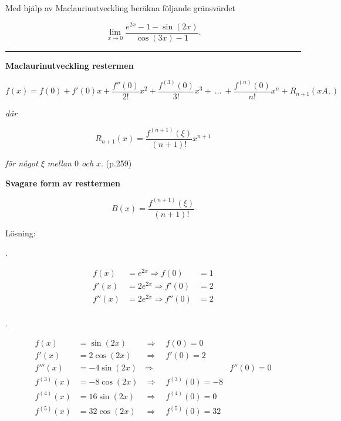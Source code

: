 \documentclass[11pt]{article}
\newcommand*\circled[1]{\tikz[baseline=(char.base)]{
            \node[shape=circle,draw,inner sep=1pt] (char) {#1};}}
\begin{document}
Med hjälp av Maclaurinutveckling beräkna följande gränsvärdet

\[
    \lim_{x \to 0} \frac{e^{2x} - 1 - \sin(2x)}{\cos(3x) - 1}.
\]

\noindent\rule{\textwidth}{0.5pt}

\textbf{Maclaurinutveckling restermen}

\[
    f(x) = f(0) + f'(0)x + \frac{f''(0)}{2!}x^2 + \frac{f^{(3)}(0)}{3!}x^3 +\ ...\ + \frac{f^{(n)}(0)}{n!}x^n + R_{n + 1}(xA,)
\]

\textit{där}


\[
    R_{n + 1}(x) = \frac{f^{(n + 1)}(\xi)}{(n +  1)!}x^{n + 1}
\]

\textit{för något $\xi$ mellan $0$ och $x$}. (p.259)

\textbf{Svagare form av resttermen}

\[
    B(x) = \frac{f^{(n + 1)}(\xi)}{(n + 1)!}
\]

Lösning:

\circled{1}.%
\begin{minipage}[t]{5cm}
    \setlength{\abovedisplayskip}{0pt}
    \setlength{\belowdisplayskip}{0pt}
    \setlength{\abovedisplayshortskip}{0pt}
    \setlength{\belowdisplayshortskip}{0pt}
    \begin{align*}
        f(x)  &= e^{2x} \Rightarrow f(0) &= 1\\
        f'(x) &= 2e^{2x} \Rightarrow f'(0) &= 2\\
        f''(x) &= 2e^{2x} \Rightarrow f''(0) &= 2\\
    \end{align*}
\end{minipage}

\circled{2}.%
\begin{minipage}[t]{5cm}
    \setlength{\abovedisplayskip}{0pt}
    \setlength{\belowdisplayskip}{0pt}
    \setlength{\abovedisplayshortskip}{0pt}
    \setlength{\belowdisplayshortskip}{0pt}
    \begin{align*}
        f(x)  &= \sin(2x) &\Rightarrow\quad f(0) = 0\\
        f'(x) &= 2\cos(2x) &\Rightarrow\quad f'(0) = 2\\
        f'''(x) &= -4\sin(2x) &\Rightarrow\quad  &f''(0) = 0\\
        f^{(3)}(x) &= -8\cos(2x) &\Rightarrow\quad f^{(3)}(0) = -8\\
        f^{(4)}(x) &= 16\sin(2x) &\Rightarrow\quad f^{(4)}(0) = 0\\
        f^{(5)}(x) &= 32\cos(2x) &\Rightarrow\quad f^{(5)}(0) = 32
    \end{align*}
\end{minipage}
\end{document}
